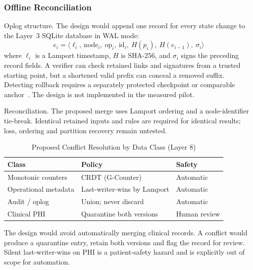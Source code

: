 \documentclass{ieeeaccess}
\renewcommand{\textbf}[1]{#1}
\begin{document}
\subsubsection{Offline Reconciliation}
\label{subsubsec:reconciliation}

\noindent\textbf{Oplog structure.} The design would append one record for every state change to the Layer~3 SQLite database in WAL mode:
\begin{equation}
e_i = \bigl\langle \ell_i,\ \text{node}_i,\ \text{op}_i,\
\text{id}_i,\ H(p_i),\ H(e_{i-1}),\ \sigma_i \bigr\rangle
\end{equation}
where $\ell_i$ is a Lamport timestamp, $H$ is SHA-256, and $\sigma_i$ signs the preceding record fields. A verifier can check retained links and signatures from a trusted starting point, but a shortened valid prefix can conceal a removed suffix. Detecting rollback requires a separately protected checkpoint or comparable anchor~\cite{b_ct}. The design is not implemented in the measured pilot.

\noindent\textbf{Reconciliation.} The proposed merge uses Lamport ordering and a node-identifier tie-break. Identical retained inputs and rules are required for identical results; loss, ordering and partition recovery remain untested.

\begin{table}[ht]
\caption{Proposed Conflict Resolution by Data Class (Layer 8)}
\label{tab:conflict}
\centering
\setlength{\tabcolsep}{3pt}
\begin{tabular}{|p{52pt}|p{54pt}|p{44pt}|}
\hline
\textbf{Class} & \textbf{Policy} & \textbf{Safety} \\
\hline
Monotonic counters & CRDT (G-Counter) & Automatic \\
\hline
Operational metadata & Last-writer-wins by Lamport & Automatic \\
\hline
Audit / oplog & Union; never discard & Automatic \\
\hline
Clinical PHI & Quarantine both versions & Human review \\
\hline
\end{tabular}
\end{table}

\noindent The design would avoid automatically merging clinical records. A conflict would produce a quarantine entry, retain both versions and flag the record for review. Silent last-writer-wins on PHI is a patient-safety hazard and is explicitly out of scope for automation.
\end{document}
